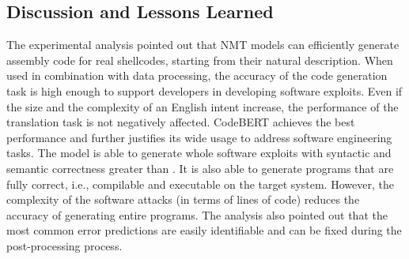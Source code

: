 \subsection{Discussion and Lessons Learned}
\label{subsec:discussion}
The experimental analysis pointed out that NMT models can efficiently generate assembly code for real shellcodes, starting from their natural description. When used in combination with data processing, the accuracy of the code generation task is high enough to support developers in developing software exploits. 
Even if the size and the complexity of an English intent increase, the performance of the translation task is not negatively affected. 
CodeBERT achieves the best performance and further justifies its wide usage to address software engineering tasks. 
The model is able to generate whole software exploits with syntactic and semantic correctness greater than . It is also able to generate programs that are fully correct, i.e., compilable and executable on the target system. However, the complexity of the software attacks (in terms of lines of code) reduces the accuracy of generating entire programs.
The analysis also pointed out that the most common error predictions are easily identifiable and can be fixed during the post-processing process. 

